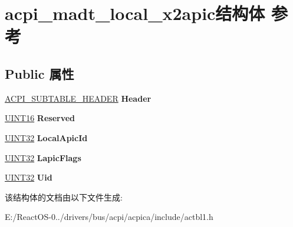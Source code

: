 \hypertarget{structacpi__madt__local__x2apic}{}\section{acpi\+\_\+madt\+\_\+local\+\_\+x2apic结构体 参考}
\label{structacpi__madt__local__x2apic}
\subsection*{Public 属性}
\begin{DoxyCompactItemize}
\item 
\mbox{\label{structacpi__madt__local__x2apic_a9558d1299f0a07b3f8b628a94f5e96d9}} 
\hyperlink{structacpi__subtable__header}{A\+C\+P\+I\+\_\+\+S\+U\+B\+T\+A\+B\+L\+E\+\_\+\+H\+E\+A\+D\+ER} {\bfseries Header}
\item 
\mbox{\label{structacpi__madt__local__x2apic_a5ff081933b1bdbfe80836d6431b3dc99}} 
\hyperlink{_processor_bind_8h_a09f1a1fb2293e33483cc8d44aefb1eb1}{U\+I\+N\+T16} {\bfseries Reserved}
\item 
\mbox{\label{structacpi__madt__local__x2apic_ac01507c8cbb0e09f700cc37288e98fbd}} 
\hyperlink{_processor_bind_8h_ae1e6edbbc26d6fbc71a90190d0266018}{U\+I\+N\+T32} {\bfseries Local\+Apic\+Id}
\item 
\mbox{\label{structacpi__madt__local__x2apic_a385505155bc903602de6511714b2be04}} 
\hyperlink{_processor_bind_8h_ae1e6edbbc26d6fbc71a90190d0266018}{U\+I\+N\+T32} {\bfseries Lapic\+Flags}
\item 
\mbox{\label{structacpi__madt__local__x2apic_a2a574f121fbb8b6657b7a5db9a53362c}} 
\hyperlink{_processor_bind_8h_ae1e6edbbc26d6fbc71a90190d0266018}{U\+I\+N\+T32} {\bfseries Uid}
\end{DoxyCompactItemize}


该结构体的文档由以下文件生成\+:\begin{DoxyCompactItemize}
\item 
E\+:/\+React\+O\+S-\/0../drivers/bus/acpi/acpica/include/actbl1.\+h\end{DoxyCompactItemize}
